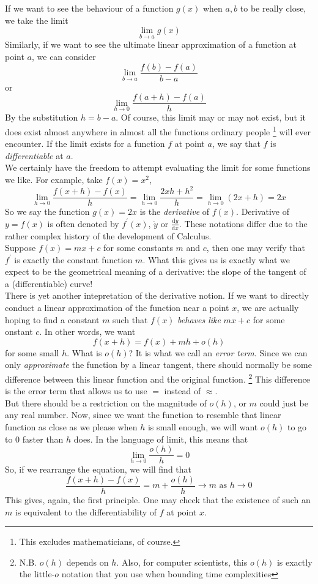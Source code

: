 If we want to see the behaviour of a function $g(x)$ when $a,b$ to be really close, we take the limit
$$\lim_{b\to a}g(x)$$
Similarly, if we want to see the ultimate linear approximation of a function at point $a$, we can consider 
$$\lim_{b\to a}\frac{f(b)-f(a)}{b-a}$$
or
$$\lim_{h\to 0}\frac{f(a+h)-f(a)}{h}$$
By the substitution $h=b-a$. Of course, this limit may or may not exist, but it does exist almost anywhere in almost all the functions ordinary people
\footnote{This excludes mathematicians, of course.}
will ever encounter.
If the limit exists for a function $f$ at point $a$, we say that $f$ is \textit{differentiable} at $a$.\\
We certainly have the freedom to attempt evaluating the limit for some functions we like. For example, take $f(x)=x^2$,
$$\lim_{h\to0}\frac{f(x+h)-f(x)}{h}=\lim_{h\to0}\frac{2xh+h^2}{h}=\lim_{h\to0}(2x+h)=2x$$
So we say the function $g(x)=2x$ is the \textit{derivative} of $f(x)$. Derivative of $y=f(x)$ is often denoted by $f^\prime(x)$, $\dot{y}$ or $\frac{\mathrm dy}{\mathrm dx}$. These notations differ due to the rather complex history of the development of Calculus.\\
Suppose $f(x)=mx+c$ for some constants $m$ and $c$, then one may verify that $f^\prime$ is exactly the constant function $m$. What this gives us is exactly what we expect to be the geometrical meaning of a derivative: the slope of the tangent of a (differentiable) curve!\\
There is yet another intepretation of the derivative notion.
If we want to directly conduct a linear approximation of the function near a point $x$, we are actually hoping to find a constant $m$ such that $f(x)$ \textit{behaves like} $mx+c$ for some onstant $c$.
In other words, we want
$$f(x+h)=f(x)+mh+o(h)$$
for some small $h$.
What is $o(h)$? It is what we call an \textit{error term}.
Since we can only \textit{approximate} the function by a linear tangent, there should normally be some difference between this linear function and the original function.
\footnote{N.B. $o(h)$ depends on $h$. Also, for computer scientists, this $o(h)$ is exactly the little-$o$ notation that you use when bounding time complexities}
This difference is the error term that allows us to use $=$ instead of $\approx$.\\
But there should be a restriction on the magnitude of $o(h)$, or $m$ could just be any real number.
Now, since we want the function to resemble that linear function as close as we please when $h$ is small enough, we will want $o(h)$ to go to $0$ faster than $h$ does.
In the language of limit, this means that
$$\lim_{h\to0}\frac{o(h)}{h}=0$$
So, if we rearrange the equation, we will find that
$$\frac{f(x+h)-f(x)}{h}=m+\frac{o(h)}{h}\to m\text{ as }h\to0$$
This gives, again, the first principle. One may check that the existence of such an $m$ is equivalent to the differentiability of $f$ at point $x$.